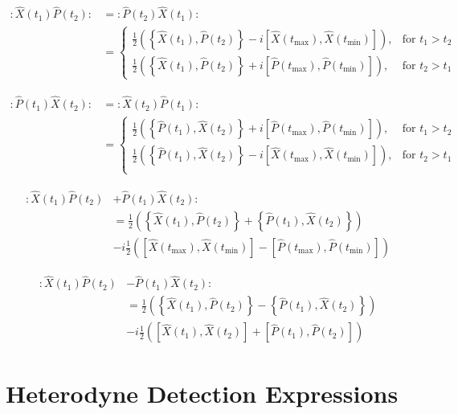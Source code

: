 \documentclass[12pt]{article}
\begin{document}
\begin{align}
:\hat{X}(t_1)\hat{P}(t_2): &= :\hat{P}(t_2)\hat{X}(t_1):\\
&= 
\begin{cases}
\frac{1}{2}\left(\left\{\hat{X}(t_1),\hat{P}(t_2)\right\} - i \left[\hat{X}(t_{\text{max}}),\hat{X}(t_{\text{min}})\right]\right), &\text{for } t_1>t_2\\
\frac{1}{2}\left(\left\{\hat{X}(t_1),\hat{P}(t_2)\right\} + i \left[\hat{P}(t_{\text{max}}),\hat{P}(t_{\text{min}})\right]\right), &\text{for } t_2>t_1
\end{cases}
\end{align}


\begin{align}
:\hat{P}(t_1)\hat{X}(t_2): &= :\hat{X}(t_2)\hat{P}(t_1):\\
&= 
\begin{cases}
\frac{1}{2}\left(\left\{\hat{P}(t_1),\hat{X}(t_2)\right\} + i \left[\hat{P}(t_{\text{max}}),\hat{P}(t_{\text{min}})\right]\right), &\text{for } t_1>t_2\\
\frac{1}{2}\left(\left\{\hat{P}(t_1),\hat{X}(t_2)\right\} - i \left[\hat{X}(t_\text{max}),\hat{X}(t_{\text{min}})\right]\right), &\text{for } t_2>t_1\\
\end{cases}
\end{align}

\begin{align}
:\hat{X}(t_1)\hat{P}(t_2) &+ \hat{P}(t_1)\hat{X}(t_2):\\
&= \frac{1}{2} \left(\left\{\hat{X}(t_1),\hat{P}(t_2)\right\} + \left\{\hat{P}(t_1),\hat{X}(t_2)\right\}\right)\\
&-i\frac{1}{2}\left(\left[\hat{X}(t_\text{max}),\hat{X}(t_\text{min})\right] -\left[\hat{P}(t_\text{max}),\hat{P}(t_\text{min})\right]\right)
\end{align}

\begin{align}
:\hat{X}(t_1)\hat{P}(t_2) &- \hat{P}(t_1)\hat{X}(t_2):\\
&= \frac{1}{2} \left(\left\{\hat{X}(t_1),\hat{P}(t_2)\right\} - \left\{\hat{P}(t_1),\hat{X}(t_2)\right\}\right)\\
&-i\frac{1}{2}\left(\left[\hat{X}(t_1),\hat{X}(t_2)\right] +\left[\hat{P}(t_1),\hat{P}(t_2)\right]\right)
\end{align}

\clearpage

\section{Heterodyne Detection Expressions}
\end{document}
